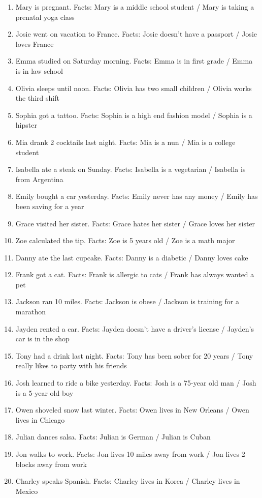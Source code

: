 \documentclass[11pt,fleqn]{article}
\newcommand{\6}{\mbox{$[\hspace*{-.6mm}[$}}
\newcommand{\9}{\mbox{$]\hspace*{-.6mm}]$}}
\begin{document}
\begin{enumerate}[leftmargin=4ex,itemsep=-2pt]
\item Mary is pregnant. Facts: Mary is a middle school student / Mary is taking a prenatal yoga class
\item Josie went on vacation to France. Facts:  Josie doesn't have a passport / Josie loves France 
\item Emma studied on Saturday morning. Facts: Emma is in first grade / Emma is in law school 
\item Olivia sleeps until noon. Facts: Olivia has two small children / Olivia works the third shift
\item Sophia got a tattoo. Facts: Sophia is a high end fashion model / Sophia is a hipster
\item Mia drank 2 cocktails last night. Facts: Mia is a nun / Mia is a college student
\item Isabella ate a steak on Sunday. Facts: Isabella is a vegetarian / Isabella is from Argentina
\item Emily bought a car yesterday. Facts: Emily never has any money / Emily has been saving for a year
\item Grace visited her sister. Facts: Grace hates her sister / Grace loves her sister
\item Zoe calculated the tip. Facts: Zoe is 5 years old / Zoe is a math major
\item Danny ate the last cupcake. Facts: Danny is a diabetic / Danny loves cake
\item Frank got a cat. Facts: Frank is allergic to cats / Frank has always wanted a pet
\item Jackson ran 10 miles. Facts: Jackson is obese / Jackson is training for a marathon
\item Jayden rented a car. Facts: Jayden doesn't have a driver's license / Jayden's car is in the shop
\item Tony had a drink last night. Facts: Tony has been sober for 20 years / Tony really likes to party with his friends
\item Josh learned to ride a bike yesterday. Facts: Josh is a 75-year old man / Josh is a 5-year old boy
\item Owen shoveled snow last winter. Facts: Owen lives in New Orleans / Owen lives in Chicago
\item Julian dances salsa. Facts: Julian is German / Julian is Cuban
\item Jon walks to work. Facts: Jon lives 10 miles away from work / Jon lives 2 blocks away from work
\item Charley speaks Spanish. Facts: Charley lives in Korea / Charley lives in Mexico
\end{enumerate}
\end{document}
